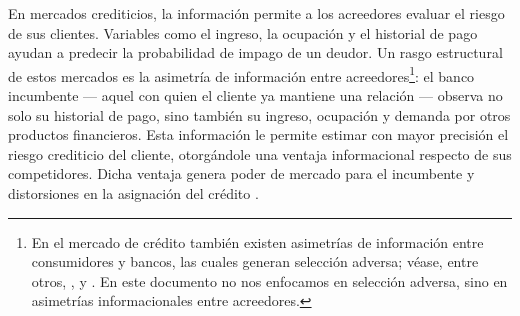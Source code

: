 \documentclass[11pt]{article}
\theoremstyle{plain}
\theoremstyle{plain}
\begin{document}

En mercados crediticios, la información permite a los acreedores evaluar el riesgo de sus clientes. Variables como el ingreso, la ocupación y el historial de pago ayudan a predecir la probabilidad de impago de un deudor. Un rasgo estructural de estos mercados es la asimetría de información entre acreedores\footnote{En el mercado de crédito también existen asimetrías de información entre consumidores y bancos, las cuales generan selección adversa; véase, entre otros, \textcite{rothschild_equilibrium_1976}, \textcite{einav_selection_2011} y \textcite{einav_io_2021}. En este documento no nos enfocamos en selección adversa, sino en asimetrías informacionales entre acreedores.}: el banco incumbente --- aquel con quien el cliente ya mantiene una relación --- observa no solo su historial de pago, sino también su ingreso, ocupación y demanda por otros productos financieros. Esta información le permite estimar con mayor precisión el riesgo crediticio del cliente, otorgándole una ventaja informacional respecto de sus competidores. Dicha ventaja genera poder de mercado para el incumbente y distorsiones en la asignación del crédito \parencite{sharpe_asymmetric_1990, dellariccia_information_2004}.


 
 
\end{document}
